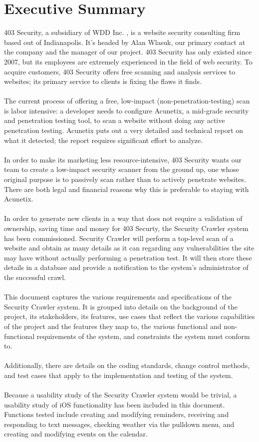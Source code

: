 \section{Executive Summary}
403 Security, a subsidiary of WDD Inc. , is a website security consulting firm based out of Indianapolis.  It’s headed by Alan Wlasuk, our primary contact at the company and the manager of our project. 403 Security has only existed  since 2007, but its employees are extremely experienced in the field of web security. To acquire customers, 403 Security offers free scanning and analysis services to websites; its primary service to clients is fixing the flaws it finds.\\\\
The current process of offering a free, low-impact (non-penetration-testing) scan is labor intensive: a developer needs to configure Acunetix, a mid-grade security and penetration testing tool, to scan a website without doing any active penetration testing. Acunetix puts out a very detailed and technical report on what it detected; the report requires significant effort to analyze.\\\\
In order to make its marketing less resource-intensive, 403 Security wants our team to create a low-impact security scanner from the ground up, one whose original purpose is to passively scan rather than to actively penetrate websites. There are both legal and financial reasons why this is preferable to staying with Acunetix.\\\\
In order to generate new clients in a way that does not require a validation of ownership, saving time and money for 403 Securty, the Security Crawler system has been commissioned.  Security Crawler will perform a top-level scan of a website and obtain as many details as it can regarding any vulnerabilities the site may have without actually performing a penetration test.  It will then store these details in a database and provide a notification to the system's administrator of the successful crawl.\\\\
This document captures the various requirements and specifications of the Security Crawler system.  It is grouped into details on the background of the project, its stakeholders, its features, use cases that reflect the various capabilities of the project and the features they map to, the various functional and non-functional requirements of the system, and constraints the system must conform to.\\\\
Additionally, there are details on the coding standards, change control methods, and test cases that apply to the implementation and testing of the system.\\\\
Because a usability study of the Security Crawler system would be trivial, a usability study of iOS functionality has been included in this document.  Functions tested include creating and modifying reminders, receiving and responding to text messages, checking weather via the pulldown menu, and creating and modifying events on the calendar.